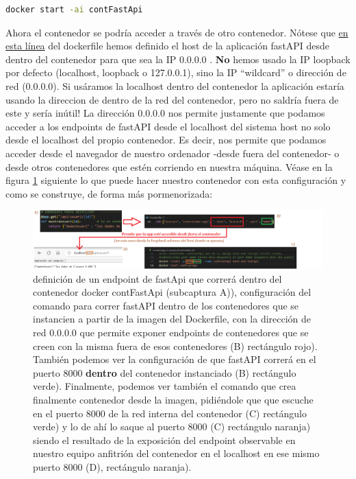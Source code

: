 \documentclass[a4paper,12pt]{report}
\begin{document}
	\begin{lstlisting}[language=bash]
		docker start -ai contFastApi
	\end{lstlisting}
	
	
	Ahora el contenedor se podría acceder a través de otro contenedor. Nótese que  \href{https://github.com/blackcub3s/mercApp/blob/cf678ebf99ce636b64c70c8faa239658a601550d/APP%20WEB/__FastAPI__/Dockerfile#L22}{en esta línea} del dockerfile hemos definido el host de la aplicación fastAPI desde dentro del contenedor para que sea la IP 0.0.0.0 . \textbf{No }hemos usado la IP loopback por defecto (localhost, loopback o 127.0.0.1), sino la IP ``wildcard'' o dirección de red (0.0.0.0). Si usáramos la localhost dentro del contenedor la aplicación estaría usando la direccion de dentro de la red del contenedor, pero no saldría fuera de este y sería inútil! La dirección 0.0.0.0 nos permite justamente que podamos acceder a los endpoints de fastAPI desde el localhost del sistema host no solo desde el localhost del propio contenedor. Es decir, nos permite que podamos acceder desde el navegador de nuestro ordenador -desde fuera del contenedor- o desde otros contenedores que estén corriendo en nuestra máquina. Véase en la figura \ref{fig:demofastapiendpointdummy} siguiente lo que puede hacer nuestro contenedor con esta configuración y como se construye, de forma más pormenorizada:
	
	\FloatBarrier
	\begin{figure}[H]
		\centering
		\caption{definición de un endpoint de fastApi que correrá dentro del contenedor docker contFastApi (subcaptura A)), configuración del comando para correr fastAPI dentro de los contenedores que se instancien a partir de la imagen del Dockerfile, con la dirección de red 0.0.0.0 que permite exponer endpoints de contenedores que se creen con la misma fuera de esos contenedores (B) rectángulo rojo). También podemos ver la configuración de que fastAPI correrá en el puerto 8000 \textbf{dentro} del contenedor instanciado (B) rectángulo verde). Finalmente, podemos ver también el comando que crea finalmente contenedor desde la imagen, pidiéndole que que escuche en el puerto 8000 de la red interna del contenedor (C) rectángulo verde) y lo de ahí lo saque al puerto 8000 (C) rectángulo naranja) siendo el resultado de la exposición del endpoint observable en nuestro equipo anfitrión del contenedor en el localhost en ese mismo puerto 8000 (D), rectángulo naranja).}
		\label{fig:demofastapiendpointdummy}
		\includegraphics[width=1\linewidth]{img/demoFastApiEndpointDummy}
	\end{figure}
	\FloatBarrier
	
\end{document}
